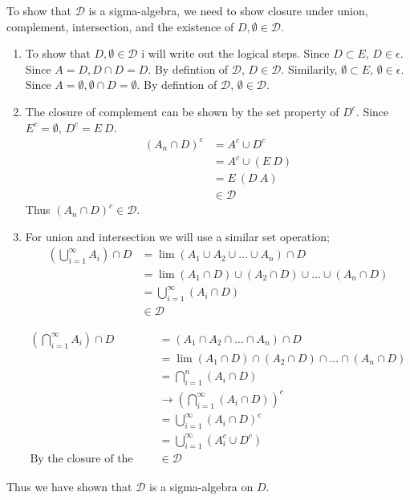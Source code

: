 \begin{solution}
	To show that $\mathcal{D}$ is a sigma-algebra, we need to show closure under union, complement, intersection, and the existence of $D, \emptyset \in \mathcal{D}$. 
	
	\begin{enumerate}
		\item To show that $D, \emptyset \in \mathcal{D}$ i will write out the logical steps. Since $D\subset E$, $D\in \epsilon$. Since $A = D, D\cap D = D$. By defintion of $\mathcal{D}$, $D \in \mathcal{D}$. Similarily, $\emptyset\subset E$, $\emptyset\in \epsilon$. Since $A = \emptyset, \emptyset\cap D = \emptyset$. By defintion of $\mathcal{D}$, $\emptyset \in \mathcal{D}$.
		
		\item The closure of complement can be shown by the set property of $D^c$. Since $E^c = \emptyset$, $D^c = E\ D$.
		\begin{align*}
			 \left(A_n \cap D\right)^c &= A^c \cup D^c \\
			 &= A^c \cup (E \ D)\\  
			 & = E \ (D\ A) \\
			 &\in \mathcal{D}
		\end{align*}
		Thus $\left(A_n \cap D\right)^c \in \mathcal{D}$.
		
		\item For union and intersection we will use a similar set operation;
		\begin{align*}
			\left(\bigcup_{i=1}^\infty A_i\right) \cap D &=\lim  \left(A_1 \cup A_2 \cup \dots \cup A_n\right) \cap D\\
			&= \lim (A_1\cap D) \cup (A_2\cap D) \cup \dots \cup (A_n\cap D)\\
			&= \bigcup_{i=1}^\infty(A_i\cap D)\\
			& \in \mathcal{D}
		\end{align*}
		
		\begin{align*}
			\left(\bigcap_{i=1}^\infty A_i\right) \cap D &= \left(A_1 \cap A_2 \cap \dots \cap A_n\right) \cap D\\
			&= \lim (A_1\cap D) \cap (A_2\cap D) \cap \dots \cap (A_n\cap D)\\
			&= \bigcap_{i=1}^n(A_i\cap D)\\
			&\rightarrow \left( \bigcap_{i=1}^\infty(A_i\cap D) \right)^c\\
			&= \bigcup_{i=1}^\infty(A_i\cap D)^c \\
			&= \bigcup_{i=1}^\infty(A_i^c\cup D^c) \\
			\text{By the closure of the complement: }& \in \mathcal{D}
		\end{align*}
	\end{enumerate}
	Thus we have shown that $\mathcal{D}$ is a sigma-algebra on $D$.
\end{solution}
\fullpageboxline

